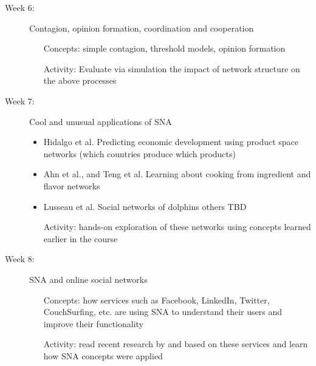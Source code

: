 \documentclass[11pt]{article} %
\begin{document}
\begin{description}
\item [Week 6:] Contagion, opinion formation, coordination and cooperation
\begin{itemize}\item[Concepts:] simple contagion, threshold models, opinion formation
\item[Activity:] Evaluate via simulation the impact of network structure on the above processes
\end{itemize}



\item [Week 7:] Cool and unusual applications of SNA

\begin{itemize}
\item Hidalgo et al. Predicting economic development using product space networks (which countries produce which products)
\item Ahn et al., and Teng et al.
 Learning about cooking from ingredient and flavor networks
\item Lusseau et al. Social networks of dolphins
others TBD
\end{itemize}
\begin{itemize}
\item[Activity:] hands-on exploration of these networks using concepts learned earlier in the course
\end{itemize}

\item [Week 8:] SNA and online social networks
\begin{itemize}\item[Concepts:] how services such as Facebook, LinkedIn, Twitter, CouchSurfing, etc. are using SNA to understand their users and improve their functionality
\item[Activity:] read recent research by and based on these services and 
learn how SNA concepts were applied
\end{itemize}


\end{description}
\end{document}
